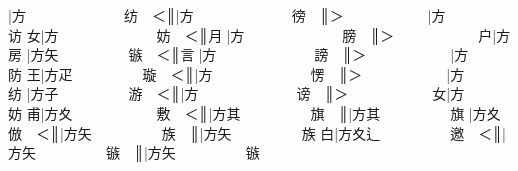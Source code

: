 {\cjk{}{\cnsym{}　　　　　}}|{\cjk{}方{\cnsym{}　　　　　　　}纺{\cnsym{}　}＜}║{\cjk{}{\cnsym{}　　　　　}}|{\cjk{}方{\cnsym{}　　　　　　　}徬{\cnsym{}　}}║{\cjk{}＞{\cnsym{}　　　　　　}}|{\cjk{}方{\cnsym{}　　　　　　　}访} 
{\cjk{}{\cnsym{}　　　　　}女}|{\cjk{}方{\cnsym{}　　　　　　　}妨{\cnsym{}　}＜}║{\cjk{}{\cnsym{}　　　　　}月{\cnjzr{}}}|{\cjk{}方{\cnsym{}　　　　　　　}膀{\cnsym{}　}}║{\cjk{}＞{\cnsym{}　　　　　　}户}|{\cjk{}方{\cnsym{}　　　　　　　}房} 
{\cjk{}{\cnsym{}　　　　　}}|{\cjk{}方矢{\cnsym{}　　　　　}镞{\cnsym{}　}＜}║{\cjk{}{\cnsym{}　　　　　}言{\cnjzr{}}}|{\cjk{}方{\cnsym{}　　　　　　　}謗{\cnsym{}　}}║{\cjk{}＞{\cnsym{}　　　　　　}}|{\cjk{}方{\cnsym{}　　　　　　　}防} 
{\cjk{}{\cnsym{}　　　　　}王}|{\cjk{}方疋{\cnsym{}　　　　　}璇{\cnsym{}　}＜}║{\cjk{}{\cnsym{}　　　　　}}|{\cjk{}方{\cnsym{}　　　　　　　}愣{\cnsym{}　}}║{\cjk{}＞{\cnsym{}　　　　　　}}|{\cjk{}方{\cnsym{}　　　　　　　}纺} 
{\cjk{}{\cnsym{}　　　　　}}|{\cjk{}方子{\cnsym{}　　　　　}游{\cnsym{}　}＜}║{\cjk{}{\cnsym{}　　　　　}}|{\cjk{}方{\cnsym{}　　　　　　　}谤{\cnsym{}　}}║{\cjk{}＞{\cnsym{}　　　　　　}女}|{\cjk{}方{\cnsym{}　　　　　　　}妨} 
{\cjk{}{\cnsym{}　　　　　}甫}|{\cjk{}方夊{\cnsym{}　　　　　　}敷{\cnsym{}　}＜}║{\cjk{}{\cnsym{}　　　　　　　}}|{\cjk{}方其{\cnsym{}　　　　　}旗{\cnsym{}　}}║{\cjk{}{\cnsym{}　　　　　　　　}}|{\cjk{}方其{\cnsym{}　　　　　}旗} 
{\cjk{}{\cnsym{}　　　　　}}|{\cjk{}方夊{\cnsym{}　　　　　　}倣{\cnsym{}　}＜}║{\cjk{}{\cnsym{}　　　　　　　}}|{\cjk{}方矢{\cnsym{}　　　　　}族{\cnsym{}　}}║{\cjk{}{\cnsym{}　　　　　　　　}}|{\cjk{}方矢{\cnsym{}　　　　　}族} 
{\cjk{}{\cnsym{}　　　　　}白}|{\cjk{}方夊辶{\cnsym{}　　　　　}邀{\cnsym{}　}＜}║{\cjk{}{\cnsym{}　　　　　　}}|{\cjk{}方矢{\cnsym{}　　　　　}镞{\cnsym{}　}}║{\cjk{}{\cnsym{}　　　　　　　}}|{\cjk{}方矢{\cnsym{}　　　　　}镞} 
